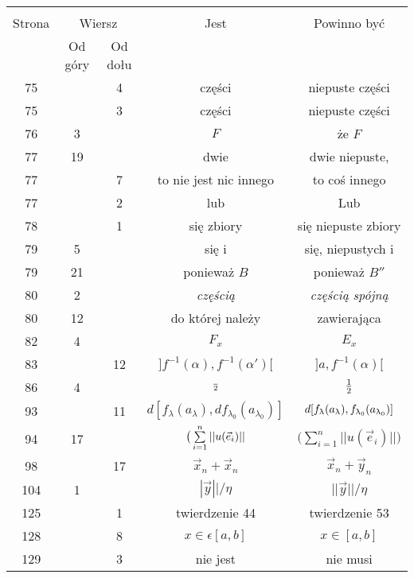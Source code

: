 \documentclass[a4paper,11pt]{article}
\begin{document}
\begin{center}
  \begin{tabular}{|c|c|c|c|c|}
    \hline
    & \multicolumn{2}{c|}{} & & \\
    Strona & \multicolumn{2}{c|}{Wiersz} & Jest
                              & Powinno być \\ \cline{2-3}
    & Od góry & Od dołu & & \\
    \hline
    75  & &  4 & części & niepuste części \\
    75  & &  3 & części & niepuste części \\
    76  &  3 & & $F$ & że $F$ \\
    77  & 19 & & dwie & dwie niepuste, \\
    77  & &  7 & to nie jest nic innego & to coś innego \\
    77  & &  2 & lub & Lub \\
    78  & &  1 & się zbiory & się niepuste zbiory \\
    79  &  5 & & się i & się, niepustych i \\
    79  & 21 & & ponieważ $B$ & ponieważ $B''$ \\
    80  &  2 & & \emph{częścią} & \emph{częścią spójną} \\
    80  & 12 & & do której należy & zawierająca \\
    82  &  4 & & $F_{ x }$ & $E_{ x }$ \\
    83  & & 12 & $] f^{ - 1 }( \alpha ), f^{ -1 }( \alpha' ) [$
           & $] a, f^{ -1 }( \alpha ) [$ \\
    86  &  4 & & $\frac{ {} }{ 2 }$ & $\frac{ 1 }{ 2 }$ \\
    93  & & 11 & $d[ f_{ \lambda }( a_{ \lambda } ), df_{ \lambda_{ 0 } }( a_{ \lambda_{ 0 } } ) ]$
           & $d[ f_{ \uplambda }( a_{ \uplambda } ), f_{ \uplambda_{ 0 } }( a_{ \uplambda_{ 0 } } ) ]$ \\
    94  & 17 & & $\big( \sum\limits_{ i = 1 }^{ n } | | u( \vec{ e }_{ i } ) | |$
           & $\big( \sum_{ i = 1 }^{ n } | | u( \vec{ e }_{ i } ) | | \big)$ \\
    98  & & 17 & $\vec{ x }_{ n } + \vec{ x }_{ n }$
           & $\vec{ x }_{ n } + \vec{ y }_{ n }$ \\
    104 &  1 & & $| \vec{ y } || / \eta$ & $|| \vec{ y } || / \eta$ \\
    125 & &  1 & twierdzenie 44 & twierdzenie 53 \\
    128 & &  8 & $x \in \epsilon [ a, b ]$ & $x \in [ a, b ]$ \\
    129 & &  3 & nie jest & nie musi \\

\end{tabular}
\end{center}
\end{document}
